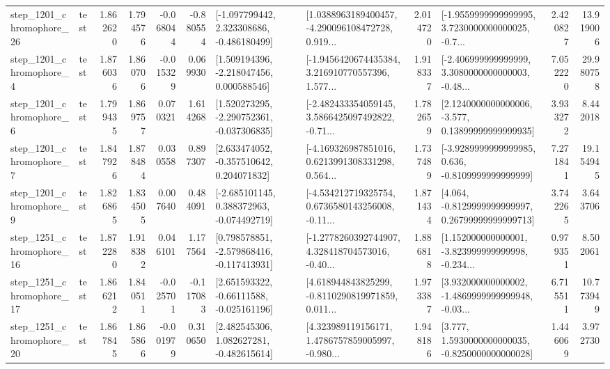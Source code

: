 \begin{tabular}{llrrrrllrlrr}
 step\_1201\_chromophore\_26 &      test &      1.862620 &    1.794576 &     -0.068044 & -0.880554 &   [-1.097799442, 2.323308686, -0.486180499] &  [1.0388963189400457, -4.290096108472728, 0.919... &       2.014720 &  [-1.9559999999999995, 3.7230000000000025, -0.7... &            2.420827 &         13.919006 \\
  step\_1201\_chromophore\_4 &      test &      1.876036 &    1.860706 &     -0.015329 &  0.069930 &    [1.509194396, -2.218047456, 0.000588546] &  [-1.9456420674435384, 3.216910770557396, 1.577... &       1.918337 &  [-2.406999999999999, 3.3080000000000003, -0.48... &            7.052220 &         29.980758 \\
  step\_1201\_chromophore\_6 &      test &      1.799435 &    1.869757 &      0.070321 &  1.614268 &   [1.520273295, -2.290752361, -0.037306835] &  [-2.482433354059145, 3.5866425097492822, -0.71... &       1.782659 &  [2.1240000000000006, -3.577, 0.13899999999999935] &            3.933272 &          8.442018 \\
  step\_1201\_chromophore\_7 &      test &      1.847926 &    1.878484 &      0.030558 &  0.897307 &    [2.633474052, -0.357510642, 0.204071832] &  [-4.169326987851016, 0.6213991308331298, 0.564... &       1.737489 &  [-3.9289999999999985, 0.636, -0.8109999999999999] &            7.271841 &         19.154945 \\
  step\_1201\_chromophore\_9 &      test &      1.826865 &    1.834505 &      0.007640 &  0.484091 &   [-2.685101145, 0.388372963, -0.074492719] &  [-4.534212719325754, 0.6736580143256008, -0.11... &       1.871434 &  [4.064, -0.8129999999999997, 0.26799999999999713] &            3.742265 &          3.643706 \\
 step\_1251\_chromophore\_16 &      test &      1.872280 &    1.918382 &      0.046101 &  1.177564 &   [0.798578851, -2.579868416, -0.117413931] &  [-1.2778260392744907, 4.328418704573016, -0.40... &       1.886818 &  [1.152000000000001, -3.823999999999998, -0.234... &            0.979351 &          8.502061 \\
 step\_1251\_chromophore\_17 &      test &      1.866212 &    1.840511 &     -0.025701 & -0.117083 &    [2.651593322, -0.66111588, -0.025161196] &  [4.618944843825299, -0.8110290819971859, 0.011... &       1.973387 &  [3.932000000000002, -1.4869999999999948, -0.03... &            6.715511 &         10.773949 \\
 step\_1251\_chromophore\_20 &      test &      1.867845 &    1.865866 &     -0.001979 &  0.310650 &    [2.482545306, 1.082627281, -0.482615614] &  [4.323989119156171, 1.4786757859005997, -0.980... &       1.948186 &   [3.777, 1.5930000000000035, -0.8250000000000028] &            1.446069 &          3.972730 \\

\end{tabular}
